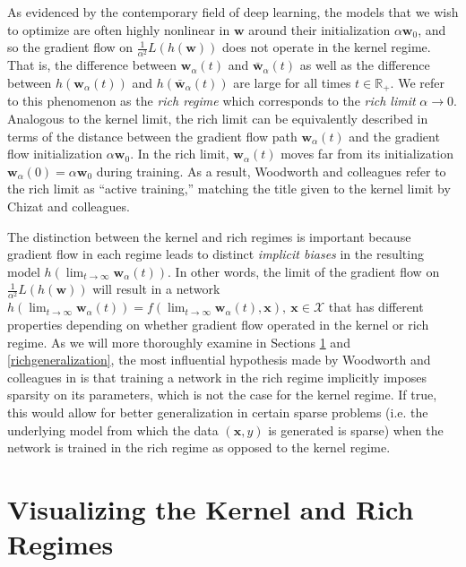 \documentclass{article}
\begin{document}
As evidenced by the contemporary field of deep learning, the models that we wish to optimize are often highly nonlinear in $\boldsymbol{w}$ around their initialization $\alpha\boldsymbol{w}_0$, and so the gradient flow on $\frac{1}{\alpha^2}L(h(\boldsymbol{w}))$ does not operate in the kernel regime. That is, the difference between $\boldsymbol{w}_{\alpha}(t)$ and $\boldsymbol{\bar{w}}_{\alpha}(t)$ as well as the difference between $h(\boldsymbol{w}_{\alpha}(t))$ and $h(\boldsymbol{\bar{w}}_{\alpha}(t))$ are large for all times $t \in \mathbb{R}_+$. We refer to this phenomenon as the \textit{rich regime} which corresponds to the \textit{rich limit} $\alpha \rightarrow 0$. Analogous to the kernel limit, the rich limit can be equivalently described in terms of the distance between the gradient flow path $\boldsymbol{w}_{\alpha}(t)$ and the gradient flow initialization $\alpha\boldsymbol{w}_0$. In the rich limit, $\boldsymbol{w}_{\alpha}(t)$ moves far from its initialization $\boldsymbol{w}_{\alpha}(0) = \alpha \boldsymbol{w}_0$ during training. As a result, Woodworth and colleagues refer to the rich limit as \enquote{active training,} matching the title given to the kernel limit by Chizat and colleagues.

The distinction between the kernel and rich regimes is important because gradient flow in each regime leads to distinct \textit{implicit biases} in the resulting model $h(\lim_{t \to\infty} \boldsymbol{w}_{\alpha}(t))$. In other words, the limit of the gradient flow on $\frac{1}{\alpha^2}L(h(\boldsymbol{w}))$ will result in a network $h(\lim_{t \to\infty} \boldsymbol{w}_{\alpha}(t)) = f(\lim_{t \to\infty} \boldsymbol{w}_{\alpha}(t), \boldsymbol{x}), \ \boldsymbol{x} \in \mathcal{X}$ that has different properties depending on whether gradient flow operated in the kernel or rich regime. As we will more thoroughly examine in Sections \ref{summarizekernel} and \ref{richgeneralization}, the most influential hypothesis made by Woodworth and colleagues in \cite{woodworth2020kernel} is that training a network in the rich regime implicitly imposes sparsity on its parameters, which is not the case for the kernel regime. If true, this would allow for better generalization in certain sparse problems (i.e. the underlying model from which the data $(\boldsymbol{x}, y)$ is generated is sparse) when the network is trained in the rich regime as opposed to the kernel regime.

\section{Visualizing the Kernel and Rich Regimes}\label{summarizekernel}
\end{document}
